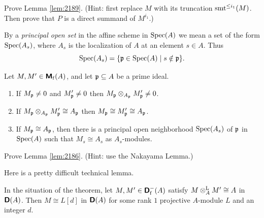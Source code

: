 \begin{exer} \label{exer:2189}
Prove Lemma \ref{lem:2189}. (Hint: first replace $M$ with its truncation 
$\operatorname{smt}^{\leq i_1}(M)$. Then prove that $P$ is a direct summand of 
$M^{i_1}$.) 
\end{exer}

By a {\em principal open set} in the affine scheme in $\operatorname{Spec}(A)$ we mean a 
set of the form $\operatorname{Spec}(A_s)$, where $A_s$ is the localization of $A$ at an 
element $s \in A$. Thus 
\[ \operatorname{Spec}(A_s) = \{ \mathfrak{p} \in \operatorname{Spec}(A) \mid s \notin \mathfrak{p} \} . \]

\begin{lem} \label{lem:2186} 
Let $M, M' \in \boldsymbol{\mathsf{M}}_{\mathrm{f}}(A)$, and let $\mathfrak{p} \subseteq A$ be a prime ideal. 
\begin{enumerate}
\item If $M_{\mathfrak{p}} \neq 0$ and $M'_{\mathfrak{p}} \neq 0$ then 
$M_{\mathfrak{p}} \otimes_{A_{\mathfrak{p}}} M'_{\mathfrak{p}} \neq 0$. 

\item If $M_{\mathfrak{p}} \otimes_{A_{\mathfrak{p}}} M'_{\mathfrak{p}} \cong A_{\mathfrak{p}}$ then 
$M_{\mathfrak{p}} \cong M'_{\mathfrak{p}} \cong A_{\mathfrak{p}}$.

\item If $M_{\mathfrak{p}} \cong A_{\mathfrak{p}}$, then there is a principal open neighborhood 
$\operatorname{Spec}(A_s)$ of $\mathfrak{p}$ in $\operatorname{Spec}(A)$ such that 
$M_s \cong A_s$ as $A_s$-modules. 
\end{enumerate}
\end{lem}

\begin{exer} \label{exer:2187}
Prove Lemma \ref{lem:2186}. (Hint: use the Nakayama Lemma.) 
\end{exer}

Here is a pretty difficult technical lemma. 

\begin{lem} \label{lem:2175}
In the situation of the theorem, let 
$M, M' \in \boldsymbol{\mathsf{D}}^{-}_{\mathrm{f}}(A)$
satisfy \lb 
$M \otimes^{\mathrm{L}}_A M' \cong A$ in $\boldsymbol{\mathsf{D}}(A)$. 
Then $M \cong L[d]$ in $\boldsymbol{\mathsf{D}}(A)$ for some rank $1$ projective $A$-module 
$L$ and an integer $d$.
\end{lem}

